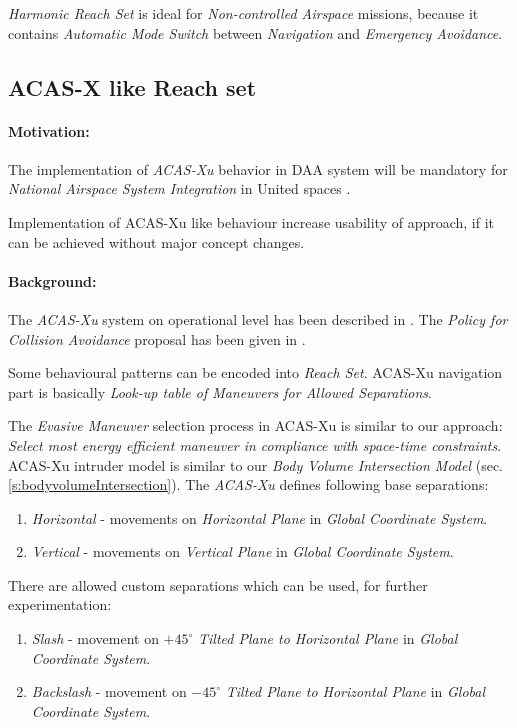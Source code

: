 \noindent \emph{Harmonic Reach Set} is ideal for \emph{Non-controlled Airspace} missions, because it contains \emph{Automatic Mode Switch} between \emph{Navigation} and \emph{Emergency Avoidance}.


\subsection{ACAS-X like Reach set}\label{s:acasReachSet}
\paragraph{Motivation:} The implementation of \emph{ACAS-Xu} behavior in DAA system will  be mandatory for \emph{National Airspace System Integration} in United spaces \cite{shively2018uas}. 

Implementation of ACAS-Xu like behaviour increase usability of approach, if it can be achieved without major concept changes.


\paragraph{Background:} The \emph{ACAS-Xu} system on operational level has been described in \cite{marston2015acas}. The \emph{Policy for Collision Avoidance} proposal has been given in \cite{julian2016policy}.

Some behavioural patterns can be encoded into  \emph{Reach Set}. ACAS-Xu navigation part is basically \emph{Look-up table of Maneuvers for Allowed Separations}.
 
The \emph{Evasive Maneuver} selection process in ACAS-Xu is similar to our approach: \emph{Select most energy efficient maneuver in compliance with space-time constraints}. ACAS-Xu intruder model is similar to our \emph{Body Volume Intersection Model} (sec. \ref{s:bodyvolumeIntersection}). The \emph{ACAS-Xu} defines following base separations:

\begin{enumerate}
    \item \emph{Horizontal} - movements on \emph{Horizontal Plane} in \emph{Global Coordinate System}.
    
    \item \emph{Vertical} - movements on \emph{Vertical Plane} in \emph{Global Coordinate System}.
    
\end{enumerate}

\noindent There are allowed custom separations which can be used, for further experimentation: 
\begin{enumerate}
    \item \emph{Slash} - movement on $+45^{\circ}$ \emph{Tilted Plane to Horizontal Plane} in \emph{Global Coordinate System}.
    
    \item \emph{Backslash} - movement on $-45^{\circ}$ \emph{Tilted Plane to Horizontal Plane} in \emph{Global Coordinate System}.
    
\end{enumerate}

